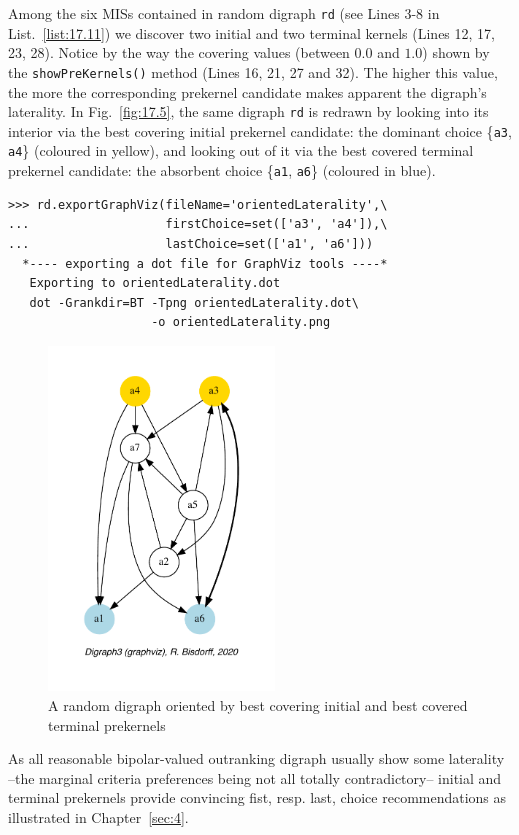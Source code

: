 Among the six MISs contained in random digraph \texttt{rd} (see Lines 3-8 in List.~\vref{list:17.11}) we discover two initial and two terminal kernels (Lines 12, 17, 23, 28). Notice by the way the covering values (between $0.0$ and $1.0$) shown by the \texttt{showPreKernels()} method (Lines 16, 21, 27 and 32). The higher this value, the more the corresponding prekernel candidate makes apparent the digraph's laterality. In Fig.~\vref{fig:17.5}, the same digraph \texttt{rd} is redrawn by looking into its interior via the best covering initial prekernel candidate: the dominant choice \{\texttt{a3}, \texttt{a4}\} (coloured in yellow), and looking out of it via the best covered terminal prekernel candidate: the absorbent choice \{\texttt{a1}, \texttt{a6}\} (coloured in blue).
\begin{lstlisting}
>>> rd.exportGraphViz(fileName='orientedLaterality',\
...                   firstChoice=set(['a3', 'a4']),\
...                   lastChoice=set(['a1', 'a6']))
  *---- exporting a dot file for GraphViz tools ----*
   Exporting to orientedLaterality.dot
   dot -Grankdir=BT -Tpng orientedLaterality.dot\
                    -o orientedLaterality.png
\end{lstlisting}
\begin{figure}[ht]
\sidecaption[t]
\includegraphics[width=6cm]{Figures/17-5-orientedLaterality.pdf}
\caption[Oriented drawing of a digraph]{A random digraph oriented by best covering initial and best covered terminal prekernels}
\label{fig:17.5}       %
\end{figure}

As all reasonable bipolar-valued outranking digraph usually show some laterality --the marginal criteria preferences being not all totally contradictory-- initial and terminal prekernels provide convincing fist, resp. last, choice recommendations as illustrated in Chapter~\vref{sec:4}.

